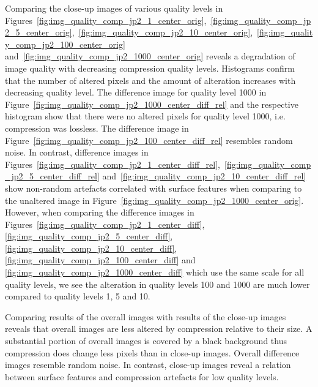 Comparing the close-up images of various quality levels in Figures~\ref{fig:img_quality_comp_jp2_1_center_orig},~\ref{fig:img_quality_comp_jp2_5_center_orig},~\ref{fig:img_quality_comp_jp2_10_center_orig},~\ref{fig:img_quality_comp_jp2_100_center_orig} and~\ref{fig:img_quality_comp_jp2_1000_center_orig} reveals a degradation of image quality with decreasing compression quality levels. Histograms confirm that the number of altered pixels and the amount of alteration increases with decreasing quality level. The difference image for quality level 1000 in Figure~\ref{fig:img_quality_comp_jp2_1000_center_diff_rel} and the respective histogram show that there were no altered pixels for quality level 1000, i.e. compression was lossless. The difference image in Figure~\ref{fig:img_quality_comp_jp2_100_center_diff_rel} resembles random noise. In contrast, difference images in Figures~\ref{fig:img_quality_comp_jp2_1_center_diff_rel},~\ref{fig:img_quality_comp_jp2_5_center_diff_rel} and~\ref{fig:img_quality_comp_jp2_10_center_diff_rel} show non-random artefacts correlated with surface features when comparing to the unaltered image in Figure~\ref{fig:img_quality_comp_jp2_1000_center_orig}. However, when comparing the difference images in Figures~\ref{fig:img_quality_comp_jp2_1_center_diff}, \ref{fig:img_quality_comp_jp2_5_center_diff}, \ref{fig:img_quality_comp_jp2_10_center_diff}, \ref{fig:img_quality_comp_jp2_100_center_diff} and \ref{fig:img_quality_comp_jp2_1000_center_diff} which use the same scale for all quality levels, we see the alteration in quality levels \SI{100}{} and \SI{1000}{} are much lower compared to quality levels \SI{1}{}, \SI{5}{} and \SI{10}{}.

Comparing results of the overall images with results of the close-up images reveals that overall images are less altered by compression relative to their size. A substantial portion of overall images is covered by a black background thus compression does change less pixels than in close-up images. Overall difference images resemble random noise. In contrast, close-up images reveal a relation between surface features and compression artefacts for low quality levels.

